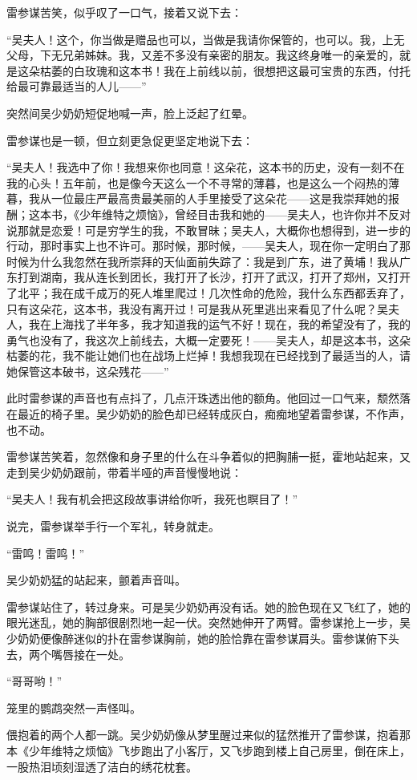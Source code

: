 \par 雷参谋苦笑，似乎叹了一口气，接着又说下去：
\par “吴夫人！这个，你当做是赠品也可以，当做是我请你保管的，也可以。我，上无父母，下无兄弟姊妹。我，又差不多没有亲密的朋友。我这终身唯一的亲爱的，就是这朵枯萎的白玫瑰和这本书！我在上前线以前，很想把这最可宝贵的东西，付托给最可靠最适当的人儿——”
\par 突然间吴少奶奶短促地喊一声，脸上泛起了红晕。
\par 雷参谋也是一顿，但立刻更急促更坚定地说下去：
\par “吴夫人！我选中了你！我想来你也同意！这朵花，这本书的历史，没有一刻不在我的心头！五年前，也是像今天这么一个不寻常的薄暮，也是这么一个闷热的薄暮，我从一位最庄严最高贵最美丽的人手里接受了这朵花——这是我崇拜她的报酬；这本书，《少年维特之烦恼》，曾经目击我和她的——吴夫人，也许你并不反对说那就是恋爱！可是穷学生的我，不敢冒昧；吴夫人，大概你也想得到，进一步的行动，那时事实上也不许可。那时候，那时候，——吴夫人，现在你一定明白了那时候为什么我忽然在我所崇拜的天仙面前失踪了：我是到广东，进了黄埔！我从广东打到湖南，我从连长到团长，我打开了长沙，打开了武汉，打开了郑州，又打开了北平；我在成千成万的死人堆里爬过！几次性命的危险，我什么东西都丢弃了，只有这朵花，这本书，我没有离开过！可是我从死里逃出来看见了什么呢？吴夫人，我在上海找了半年多，我才知道我的运气不好！现在，我的希望没有了，我的勇气也没有了，我这次上前线去，大概一定要死！——吴夫人，却是这本书，这朵枯萎的花，我不能让她们也在战场上烂掉！我想我现在已经找到了最适当的人，请她保管这本破书，这朵残花——”
\par 此时雷参谋的声音也有点抖了，几点汗珠透出他的额角。他回过一口气来，颓然落在最近的椅子里。吴少奶奶的脸色却已经转成灰白，痴痴地望着雷参谋，不作声，也不动。
\par 雷参谋苦笑着，忽然像和身子里的什么在斗争着似的把胸脯一挺，霍地站起来，又走到吴少奶奶跟前，带着半哑的声音慢慢地说：
\par “吴夫人！我有机会把这段故事讲给你听，我死也瞑目了！”
\par 说完，雷参谋举手行一个军礼，转身就走。
\par “雷鸣！雷鸣！”
\par 吴少奶奶猛的站起来，颤着声音叫。
\par 雷参谋站住了，转过身来。可是吴少奶奶再没有话。她的脸色现在又飞红了，她的眼光迷乱，她的胸部很剧烈地一起一伏。突然她伸开了两臂。雷参谋抢上一步，吴少奶奶便像醉迷似的扑在雷参谋胸前，她的脸恰靠在雷参谋肩头。雷参谋俯下头去，两个嘴唇接在一处。
\par “哥哥哟！”
\par 笼里的鹦鹉突然一声怪叫。
\par 偎抱着的两个人都一跳。吴少奶奶像从梦里醒过来似的猛然推开了雷参谋，抱着那本《少年维特之烦恼》飞步跑出了小客厅，又飞步跑到楼上自己房里，倒在床上，一股热泪顷刻湿透了洁白的绣花枕套。

